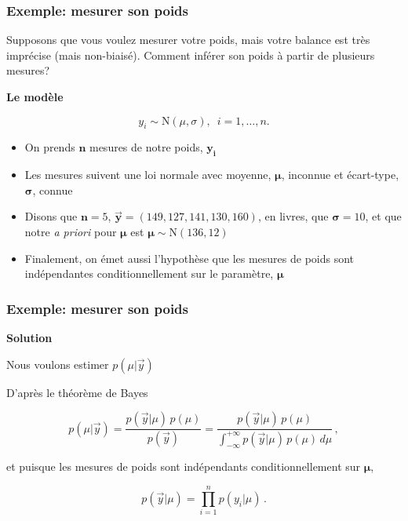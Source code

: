 \documentclass{beamer}
\begin{document}
\begin{frame}
    \frametitle{Exemple: mesurer son poids}
    Supposons que vous voulez mesurer votre poids, mais votre balance
    est très imprécise (mais non-biaisé). Comment inférer son poids à partir de plusieurs mesures?

    \pause

    \vfill

    \textbf{Le modèle}

    \[y_i \sim \textrm{N}(\mu, \sigma), \, \, \, i = 1, \ldots, n.\]

    \pause

    \begin{itemize}
      \item On prends $\boldsymbol{n}$ mesures de notre poids, $\boldsymbol{y_i}$
      \pause
      \item Les mesures suivent une loi normale avec moyenne, $\boldsymbol{\mu}$,
            inconnue et écart-type, $\boldsymbol{\sigma}$, connue
      \pause
      \item Disons que $\boldsymbol{n} = 5$, $\boldsymbol{\vec{y}} = (149, 127, 141, 130, 160)$, en livres,
            que $\boldsymbol{\sigma} = 10$, et que notre \emph{a priori} pour $\boldsymbol{\mu}$
            est $\boldsymbol{\mu} \sim \textrm{N}(136, 12)$
      \pause
      \item Finalement, on émet aussi l'hypothèse que les mesures de poids sont indépendantes
            conditionnellement sur le paramètre, $\boldsymbol{\mu}$
    \end{itemize}
\end{frame}


\begin{frame}
    \frametitle{Exemple: mesurer son poids}
    \textbf{Solution}

    \vfill

    Nous voulons estimer $p(\mu | \vec{y})$

    \pause

    \vfill

    D'après le théorème de Bayes

    \[p(\mu | \vec{y}) = \frac{p(\vec{y} | \mu) \, p(\mu)}{p(\vec{y})} 
      = \frac{p(\vec{y} | \mu) \, p(\mu)}{\int_{-\infty}^{+\infty} p(\vec{y} | \mu) \, p(\mu) \, d\mu} \, ,\]

    \pause

    et puisque les mesures de poids sont indépendants conditionnellement sur $\boldsymbol{\mu}$,

    \[p(\vec{y} | \mu) = \prod_{i=1}^{n} p(y_i | \mu) \, .\]
\end{frame}
\end{document}
